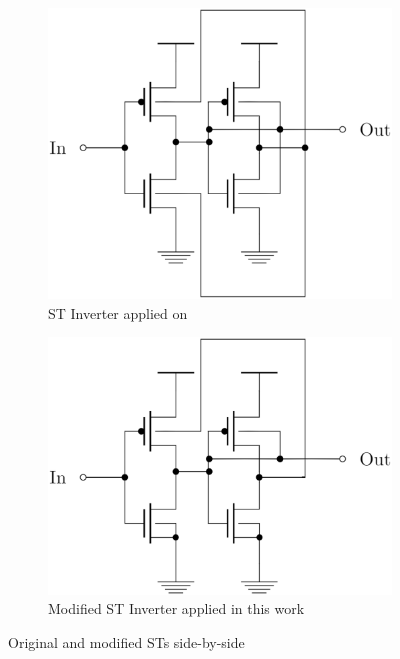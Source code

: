 \documentclass[ecp,tc, english]{iiufrgs}
\begin{document}
\begin{figure}[H]
\centering
\begin{subfigure}{.5\textwidth}
  \centering
  \includegraphics[width=.8\linewidth]{STOriginal.eps}
  \caption{ST Inverter applied on \citet{dokania2015circuit}}
  \label{fig:sub1}
\end{subfigure}%
\begin{subfigure}{.5\textwidth}
  \centering
  \includegraphics[width=.8\linewidth]{STcorrigido.eps}
  \caption{Modified ST Inverter applied in this work}
  \label{fig:sub2}
\end{subfigure}
\caption{Original and modified STs side-by-side}
\label{fig:test}
\end{figure}
\end{document}
